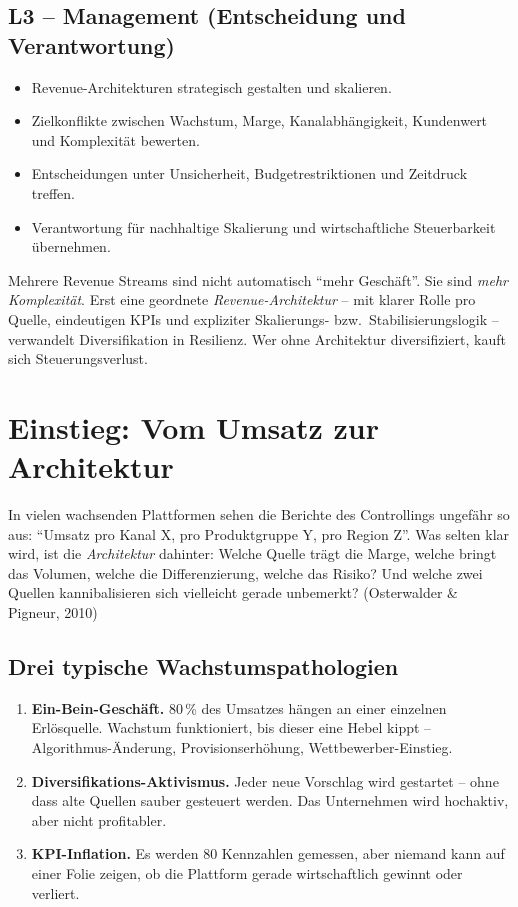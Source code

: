 \documentclass[11pt,a4paper,oneside]{article}
\newcommand{\fachbegriff}[1]{\textbf{#1}}
\newcommand{\quelle}[1]{{\footnotesize\color{lpGray}(#1)}}
\begin{document}
\subsection*{L3 -- Management (Entscheidung und Verantwortung)}
\begin{itemize}
  \item Revenue-Architekturen strategisch gestalten und skalieren.
  \item Zielkonflikte zwischen Wachstum, Marge, Kanalabhängigkeit, Kundenwert und Komplexität bewerten.
  \item Entscheidungen unter Unsicherheit, Budgetrestriktionen und Zeitdruck treffen.
  \item Verantwortung für nachhaltige Skalierung und wirtschaftliche Steuerbarkeit übernehmen.
\end{itemize}

\begin{merkbox}
Mehrere Revenue Streams sind nicht automatisch ``mehr Geschäft''. Sie sind \emph{mehr Komplexität}. Erst eine geordnete \emph{Revenue-Architektur} -- mit klarer Rolle pro Quelle, eindeutigen KPIs und expliziter Skalierungs- bzw.\ Stabilisierungslogik -- verwandelt Diversifikation in Resilienz. Wer ohne Architektur diversifiziert, kauft sich Steuerungsverlust.
\end{merkbox}

\clearpage

\section{Einstieg: Vom Umsatz zur Architektur}

In vielen wachsenden Plattformen sehen die Berichte des Controllings ungefähr so aus: ``Umsatz pro Kanal X, pro Produktgruppe Y, pro Region Z''. Was selten klar wird, ist die \emph{Architektur} dahinter: Welche Quelle trägt die Marge, welche bringt das Volumen, welche die Differenzierung, welche das Risiko? Und welche zwei Quellen kannibalisieren sich vielleicht gerade unbemerkt? \quelle{Osterwalder \& Pigneur, 2010}

\subsection{Drei typische Wachstumspathologien}

\begin{enumerate}
  \item \fachbegriff{Ein-Bein-Geschäft.} 80\,\% des Umsatzes hängen an einer einzelnen Erlösquelle. Wachstum funktioniert, bis dieser eine Hebel kippt -- Algorithmus-Änderung, Provisionserhöhung, Wettbewerber-Einstieg.
  \item \fachbegriff{Diversifikations-Aktivismus.} Jeder neue Vorschlag wird gestartet -- ohne dass alte Quellen sauber gesteuert werden. Das Unternehmen wird hochaktiv, aber nicht profitabler.
  \item \fachbegriff{KPI-Inflation.} Es werden 80 Kennzahlen gemessen, aber niemand kann auf einer Folie zeigen, ob die Plattform gerade wirtschaftlich gewinnt oder verliert.
\end{enumerate}
\end{document}

